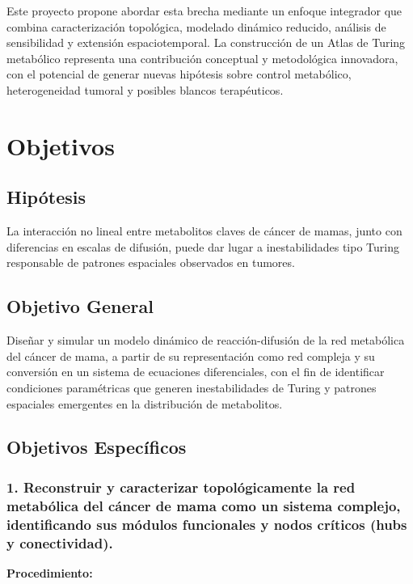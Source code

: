 \documentclass[12pt,spanish]{article}
\newcommand{\procedimiento}{\textbf{Procedimiento:}}
\begin{document}
	Este proyecto propone abordar esta brecha mediante un enfoque integrador que combina caracterización topológica, modelado dinámico reducido, análisis de sensibilidad y extensión espaciotemporal. La construcción de un Atlas de Turing metabólico representa una contribución conceptual y metodológica innovadora, con el potencial de generar nuevas hipótesis sobre control metabólico, heterogeneidad tumoral y posibles blancos terapéuticos.

	\section{Objetivos}
	
	\subsection*{Hipótesis}
	
	La interacción no lineal entre metabolitos claves de cáncer de mamas, junto con diferencias en escalas de difusión, puede dar lugar a inestabilidades tipo Turing responsable de patrones espaciales observados en tumores. 
	
	\subsection*{Objetivo General}
	
	Diseñar y simular un modelo dinámico de reacción-difusión de la red metabólica del cáncer de mama, a partir de su representación como red compleja y su conversión en un sistema de ecuaciones diferenciales, con el fin de identificar condiciones paramétricas que generen inestabilidades de Turing y patrones espaciales emergentes en la distribución de metabolitos. 
	
	\subsection*{Objetivos Específicos}
	
	\subsubsection*{1. Reconstruir y caracterizar topológicamente la red metabólica del cáncer de mama como un sistema complejo, identificando sus módulos funcionales y nodos críticos (hubs y conectividad).}
	
	\procedimiento
	
\end{document}
